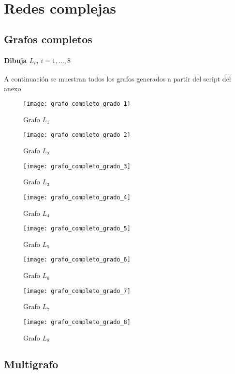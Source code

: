 \chapter{Redes complejas}
\section{Grafos completos}
\subsubsection{\large Dibuja $L_i$, $i=1,...,8$} 
A continuación se muestran todos los grafos generados a partir del script del anexo.
\begin{figure}
	\centering
	\texttt{[image: grafo\_completo\_grado\_1]}
	\caption{Grafo $L_1$}
\end{figure}
\begin{figure}
	\centering
	\texttt{[image: grafo\_completo\_grado\_2]}
	\caption{Grafo $L_2$}
\end{figure}
\begin{figure}
	\centering
	\texttt{[image: grafo\_completo\_grado\_3]}
	\caption{Grafo $L_3$}
\end{figure}
\begin{figure}
	\centering
	\texttt{[image: grafo\_completo\_grado\_4]}
	\caption{Grafo $L_4$}
\end{figure}
\begin{figure}
	\centering
	\texttt{[image: grafo\_completo\_grado\_5]}
	\caption{Grafo $L_5$}
\end{figure}
\begin{figure}
	\centering
	\texttt{[image: grafo\_completo\_grado\_6]}
	\caption{Grafo $L_6$}
\end{figure}
\begin{figure}
	\centering
	\texttt{[image: grafo\_completo\_grado\_7]}
	\caption{Grafo $L_7$}
\end{figure}
\begin{figure}
	\centering
	\texttt{[image: grafo\_completo\_grado\_8]}
	\caption{Grafo $L_8$}
\end{figure}

\section{Multigrafo}
